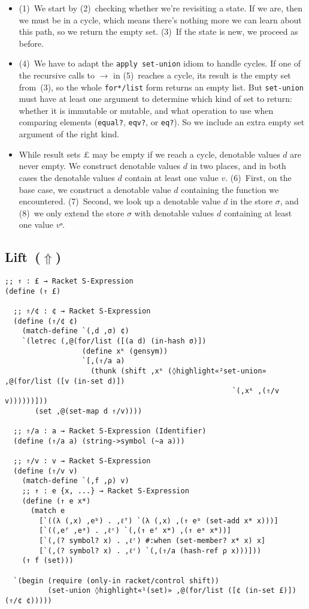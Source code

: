 \documentclass[12pt, oneside]{book}
\begin{document}
\begin{itemize}
  \item (1)~We start by (2)~checking whether we’re revisiting a state. If we are, then we must be in a cycle, which means there’s nothing more we can learn about this path, so we return the empty set. (3)~If the state is new, we proceed as before.
  \item (4)~We have to adapt the \texttt{apply set-union} idiom to handle cycles. If one of the recursive calls to \(→\) in (5)~reaches a cycle, its result is the empty set from~(3), so the whole \texttt{for*/list} form returns an empty list. But \texttt{set-union} must have at least one argument to determine which kind of set to return: whether it is immutable or mutable, and what operation to use when comparing elements (\texttt{equal?}, \texttt{eqv?}, or \texttt{eq?}). So we include an extra empty set argument of the right kind.
  \item While result sets \(£\) may be empty if we reach a cycle, denotable values \(d\) are never empty. We construct denotable values \(d\) in two places, and in both cases the denotable values \(d\) contain at least one value \(v\). (6)~First, on the base case, we construct a denotable value \(d\) containing the function we encountered. (7)~Second, we look up a denotable value \(d\) in the store \(σ\), and (8)~we only extend the store \(σ\) with denotable values \(d\) containing at least one value \(vᵃ\).
\end{itemize}

\subsection{Lift~(\(⇑\))}

\begin{Verbatim}
;; ⇑ : £ → Racket S-Expression
(define (⇑ £)

  ;; ⇑/¢ : ¢ → Racket S-Expression
  (define (⇑/¢ ¢)
    (match-define `(,d ,σ) ¢)
    `(letrec (,@(for/list ([(a d) (in-hash σ)])
                  (define xᵏ (gensym))
                  `[,(⇑/a a)
                    (thunk (shift ,xᵏ (◊highlight«²set-union» ,@(for/list ([v (in-set d)])
                                                     `(,xᵏ ,(⇑/v v))))))]))
       (set ,@(set-map d ⇑/v))))

  ;; ⇑/a : a → Racket S-Expression (Identifier)
  (define (⇑/a a) (string->symbol (~a a)))

  ;; ⇑/v : v → Racket S-Expression
  (define (⇑/v v)
    (match-define `(,f ,ρ) v)
    ;; ↑ : e {x, ...} → Racket S-Expression
    (define (↑ e x*)
      (match e
        [`((λ (,x) ,eᵇ) . ,ℓᶠ) `(λ (,x) ,(↑ eᵇ (set-add x* x)))]
        [`((,eᶠ ,eᵃ) . ,ℓᶜ) `(,(↑ eᶠ x*) ,(↑ eᵃ x*))]
        [`(,(? symbol? x) . ,ℓʳ) #:when (set-member? x* x) x]
        [`(,(? symbol? x) . ,ℓʳ) `(,(⇑/a (hash-ref ρ x)))]))
    (↑ f (set)))

  `(begin (require (only-in racket/control shift))
          (set-union ◊highlight«¹(set)» ,@(for/list ([¢ (in-set £)]) (⇑/¢ ¢)))))
\end{Verbatim}
\end{document}
